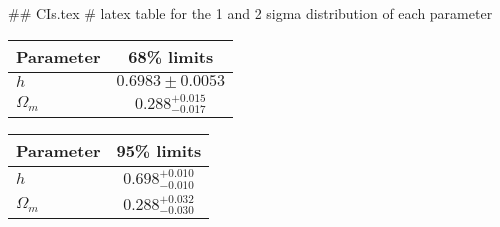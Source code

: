 ## CIs.tex
# latex table for the 1 and 2 sigma distribution of each parameter

\begin{tabular} { l  c}
 Parameter &  68\% limits\\
\hline
{\boldmath$h              $} & $0.6983\pm 0.0053          $\\
{\boldmath$\Omega_m       $} & $0.288^{+0.015}_{-0.017}   $\\
\hline
\end{tabular}

\begin{tabular} { l  c}
 Parameter &  95\% limits\\
\hline
{\boldmath$h              $} & $0.698^{+0.010}_{-0.010}   $\\
{\boldmath$\Omega_m       $} & $0.288^{+0.032}_{-0.030}   $\\
\hline
\end{tabular}
